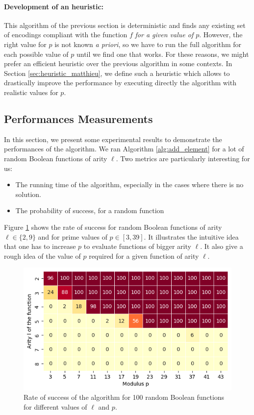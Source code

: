 \paragraph{Development of an heuristic:} This algorithm of the previous section is deterministic and finds any existing set of encodings compliant with the function $f$ \emph{for a given value of $p$}. However, the right value for $p$ is not known \emph{a priori}, so we have to run the full algorithm for each possible value of $p$ until we find one that works. For these reasons, we might prefer an efficient heuristic over the previous algorithm in some contexts. In Section \ref{sec:heuristic_matthieu}, we define such a heuristic which allows to drastically improve the performance by executing directly the algorithm with realistic values for $p$. 




\subsection{Performances Measurements}

In this section, we present some experimental results to demonstrate the performances of the algorithm. We ran Algorithm \ref{alg:add_element} for a lot of random Boolean functions of arity $\ell$. Two metrics are particularly interesting for us:
\begin{itemize}
    \item The running time of the algorithm, especially in the cases where there is no solution.
    \item The probability of success, for a random function
\end{itemize}


Figure \ref{fig:heatmap_success} shows the rate of success for random Boolean functions of arity $\ell \in \{2, 9\}$ and for prime values of $p \in [3, 39]$. It illustrates the intuitive idea that one has to increase $p$ to evaluate functions of bigger arity $\ell$. It also give a rough idea of the value of $p$ required for a given function of arity $\ell$.

\begin{figure}
    \centering
    \includegraphics[]{img/p_encodings/heatmap_success.png}
    \caption{Rate of success of the algorithm for 100 random Boolean functions for different values of $\ell$ and $p$.}
    \label{fig:heatmap_success}
\end{figure}


